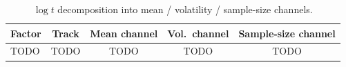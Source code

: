 \begin{table}[htbp]
  \centering
  \caption{$\log t$ decomposition into mean / volatility / sample-size channels.}
  \label{tab:t-channels}
  \begin{tabular}{lcccc}
    \toprule
    Factor & Track & Mean channel & Vol.\ channel & Sample-size channel \\
    \midrule
    TODO & TODO & TODO & TODO & TODO \\
    \bottomrule
  \end{tabular}
\end{table}
